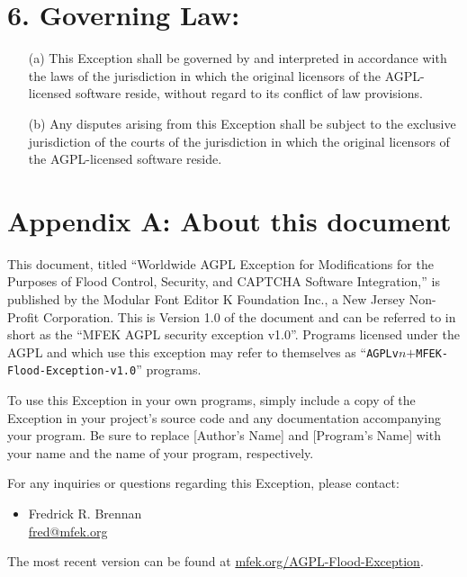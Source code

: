 \documentclass[12pt]{article}
\begin{document}
\section*{6. Governing Law:}
\begin{enumerate}
\item[(a)] This Exception shall be governed by and interpreted in accordance with the laws of the jurisdiction in which the original licensors of the AGPL-licensed software reside, without regard to its conflict of law provisions.

\item[(b)] Any disputes arising from this Exception shall be subject to the exclusive jurisdiction of the courts of the jurisdiction in which the original licensors of the AGPL-licensed software reside.
\end{enumerate}

\section*{Appendix A: About this document}
This document, titled ``Worldwide AGPL Exception for Modifications for the Purposes of Flood Control, Security, and CAPTCHA Software Integration,'' is published by the Modular Font Editor K Foundation Inc., a New Jersey Non-Profit Corporation. This is Version 1.0 of the document and can be referred to in short as the ``MFEK AGPL security exception v1.0''. Programs licensed under the AGPL and which use this exception may refer to themselves as ``\texttt{AGPLv$n$$+$MFEK-Flood-Exception-v1.0}'' programs.

To use this Exception in your own programs, simply include a copy of the Exception in your project's source code and any documentation accompanying your program. Be sure to replace [Author's Name] and [Program's Name] with your name and the name of your program, respectively.

For any inquiries or questions regarding this Exception, please contact:

\begin{itemize}
	\item Fredrick R. Brennan \\
\href{mailto:fred@mfek.org}{fred@mfek.org}
\end{itemize}

The most recent version can be found at \url{mfek.org/AGPL-Flood-Exception}.
\end{document}
